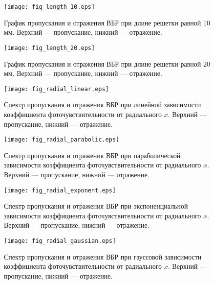\begin{figure}
  \centering
  \texttt{[image: fig\_length\_10.eps]}\\
  \caption{График пропускания и отражения ВБР при длине решетки равной 10 мм. Верхний --- пропускание, нижний --- отражение.}\label{fig_length_10}
\end{figure}

\begin{figure}
  \centering
  \texttt{[image: fig\_length\_20.eps]}\\
  \caption{График пропускания и отражения ВБР при длине решетки равной 20 мм. Верхний --- пропускание, нижний --- отражение.}\label{fig_length_20}
\end{figure}

\begin{figure}
  \centering
  \texttt{[image: fig\_radial\_linear.eps]}\\
  \caption{Спектр пропускания и отражения ВБР при линейной зависимости коэффициента фоточувствительности от радиального $x$. Верхний --- пропускание, нижний --- отражение.}\label{fig_radial_linear}
\end{figure}

\begin{figure}
  \centering
  \texttt{[image: fig\_radial\_parabolic.eps]}\\
  \caption{Спектр пропускания и отражения ВБР при параболической зависимости коэффициента фоточувствительности от радиального $x$. Верхний --- пропускание, нижний --- отражение.}\label{fig_radial_parabolic}
\end{figure}

\begin{figure}
  \centering
  \texttt{[image: fig\_radial\_exponent.eps]}\\
  \caption{Спектр пропускания и отражения ВБР при экспоненциальной зависимости коэффициента фоточувствительности от радиального $x$. Верхний --- пропускание, нижний --- отражение.}\label{fig_radial_exponent}
\end{figure}

\begin{figure}
  \centering
  \texttt{[image: fig\_radial\_gaussian.eps]}\\
  \caption{Спектр пропускания и отражения ВБР при гауссовой зависимости коэффициента фоточувствительности от радиального $x$. Верхний --- пропускание, нижний --- отражение.}\label{fig_radial_gaussian}
\end{figure}

